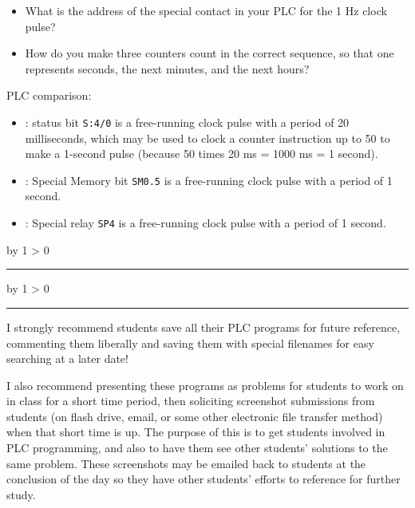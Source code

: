 \documentclass[12pt,a4paper]{article}
\def\svar{
           \advance\answnum by 1
           \ifnum \answnum > 0
                \hrule
                \vskip 3pt
                \leftline{Svar \the\answnum}
                \vskip 3pt \fi}
\def\notes{
           \advance\explnum by 1
           \ifnum \explnum > 0
                \hrule
                \vskip 3pt
                \leftline{Notes \the\explnum}
                \vskip 3pt \fi}
\begin{document}
\begin{itemize}
\item{} What is the address of the special contact in your PLC for the 1 Hz clock pulse?
\item{} How do you make three counters count in the correct sequence, so that one represents seconds, the next minutes, and the next hours?
\end{itemize}


\vfil 

\noindent
PLC comparison:

\begin{itemize}
\item{} : status bit {\tt S:4/0} is a free-running clock pulse with a period of 20 milliseconds, which may be used to clock a counter instruction up to 50 to make a 1-second pulse (because 50 times 20 ms = 1000 ms = 1 second).
\vskip 5pt
\item{} : Special Memory bit {\tt SM0.5} is a free-running clock pulse with a period of 1 second.
\vskip 5pt
\item{} : Special relay {\tt SP4} is a free-running clock pulse with a period of 1 second. 
\end{itemize}

\eject
\vskip 10pt \filbreak 





\svar{} 


\vskip 10pt \filbreak 





\notes{} 

I strongly recommend students save all their PLC programs for future reference, commenting them liberally and saving them with special filenames for easy searching at a later date!

\vskip 10pt

I also recommend presenting these programs as problems for students to work on in class for a short time period, then soliciting screenshot submissions from students (on flash drive, email, or some other electronic file transfer method) when that short time is up.  The purpose of this is to get students involved in PLC programming, and also to have them see other students' solutions to the same problem.  These screenshots may be emailed back to students at the conclusion of the day so they have other students' efforts to reference for further study.
\end{document}
